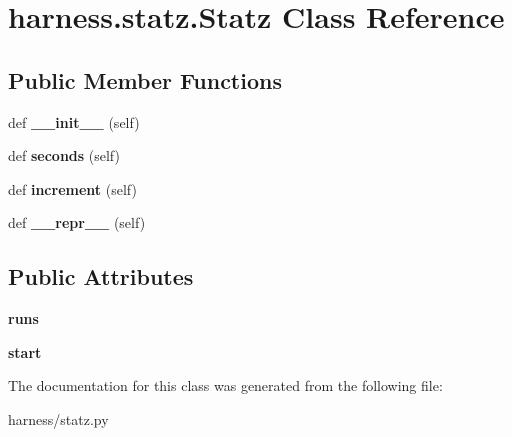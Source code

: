 \hypertarget{classharness_1_1statz_1_1_statz}{}\section{harness.\+statz.\+Statz Class Reference}
\label{classharness_1_1statz_1_1_statz}
\subsection*{Public Member Functions}
\begin{DoxyCompactItemize}
\item 
\mbox{\label{classharness_1_1statz_1_1_statz_a55b4a8e09a69261af5b6d5c5035e129c}} 
def {\bfseries \+\_\+\+\_\+init\+\_\+\+\_\+} (self)
\item 
\mbox{\label{classharness_1_1statz_1_1_statz_ace2867c2a09c85a49030b9ca60f04994}} 
def {\bfseries seconds} (self)
\item 
\mbox{\label{classharness_1_1statz_1_1_statz_a3262739dc8fad16b770b618205390cef}} 
def {\bfseries increment} (self)
\item 
\mbox{\label{classharness_1_1statz_1_1_statz_ad05a990d2a71fe0928d5ffbb86cf742e}} 
def {\bfseries \+\_\+\+\_\+repr\+\_\+\+\_\+} (self)
\end{DoxyCompactItemize}
\subsection*{Public Attributes}
\begin{DoxyCompactItemize}
\item 
\mbox{\label{classharness_1_1statz_1_1_statz_a68abad440226918f2c8dc1aa2df4f07b}} 
{\bfseries runs}
\item 
\mbox{\label{classharness_1_1statz_1_1_statz_a0723e9ba5f5adeb0d7d16f9fa10de966}} 
{\bfseries start}
\end{DoxyCompactItemize}


The documentation for this class was generated from the following file\+:\begin{DoxyCompactItemize}
\item 
harness/statz.\+py\end{DoxyCompactItemize}
